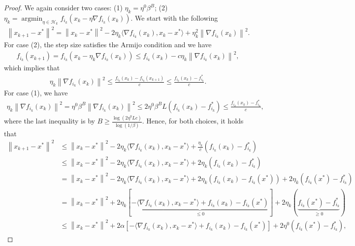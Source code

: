 \documentclass{article}
\newcommand{\norm}[1]{\left \lVert #1 \right \rVert}
\DeclareMathOperator{\argmin}{argmin}
\begin{document}
\begin{proof}
 We again consider two cases: (1) $\eta_k = \eta^{0} \beta^B$; (2) $\eta_k = \argmin_{\eta \in \mathcal{H}_k} f_{i_k}(x_k - \eta \nabla f_{i_k}(x_k))$. We start with the following
    \begin{align*}
        \norm{x_{k+1} - x^*}^2 = \norm{x_k - x ^*}^2 - 2 \eta_k \langle \nabla {f_{i_k}} (x_k), x_k - x^* \rangle + \eta_k^2 \norm{\nabla f_{i_k} (x_k)}^2.
    \end{align*}
    For case (2), the step size satisfies the Armijo condition and we have
    \begin{align*}
        f_{i_k} (x_{k+1}) = f_{i_k} (x_k - \eta_k \nabla f_{i_k}(x_k)) \leq  f_{i_k} (x_k) - c \eta_k \norm{\nabla f_{i_k} (x_k)}^2,
    \end{align*}
    which implies that
    \begin{align*}
        \eta_k \norm{\nabla f_{i_k}(x_k)}^2 \leq \frac{f_{i_k} (x_k) - f_{i_k} (x_{k+1})}{c} \leq \frac{f_{i_k} (x_k) -f^*_{i_k}}{c}. 
    \end{align*}
    For case (1), we have 
    \begin{align*}
        \eta_k \norm{\nabla f_{i_k}(x_k)}^2 = \eta^0 \beta^B \norm{\nabla f_{i_k}(x_k)}^2 \leq 2 \eta^0 \beta^B L (f_{i_k} (x_k) -f^*_{i_k}) \leq \frac{f_{i_k} (x_k) -f^*_{i_k}}{c},
    \end{align*}
    where the last inequality is by $B \geq \frac{\log(2 \eta^0 L c)}{\log(1/\beta)}$. Hence, for both choices, it holds that
    \begin{align*}
        \norm{x_{k+1} - x^*}^2 &\leq  \norm{x_k - x ^*}^2 - 2 \eta_k \langle \nabla {f_{i_k}} (x_k), x_k - x^* \rangle + \frac{\eta_k}{c} (f_{i_k} (x_k) -f^*_{i_k}) \\
        &\leq \norm{x_k - x ^*}^2 - 2 \eta_k \langle \nabla {f_{i_k}} (x_k), x_k - x^* \rangle + 2 \eta_k (f_{i_k} (x_k) -f^*_{i_k})\\
        &= \norm{x_k - x ^*}^2 - 2 \eta_k \langle \nabla {f_{i_k}} (x_k), x_k - x^* \rangle + 2 \eta_k (f_{i_k} (x_k) -f_{i_k}(x^*)) + 2 \eta_k (f_{i_k}(x^*) -f^*_{i_k}) \\
        &= \norm{x_k - x ^*}^2  + 2 \eta_k [\underbrace{-\langle \nabla {f_{i_k}} (x_k), x_k - x^* \rangle + f_{i_k} (x_k) -f_{i_k}(x^*)}_{\leq 0}] + 2 \eta_k (\underbrace{f_{i_k}(x^*) -f^*_{i_k}}_{\geq 0}) \\ 
        &\leq \norm{x_k - x ^*}^2 + 2 \alpha  [-\langle \nabla {f_{i_k}} (x_k), x_k - x^* \rangle + f_{i_k} (x_k) -f_{i_k}(x^*)] + 2 \eta^0 (f_{i_k}(x^*) -f^*_{i_k}),

\end{align*}
\end{proof}
\end{document}
